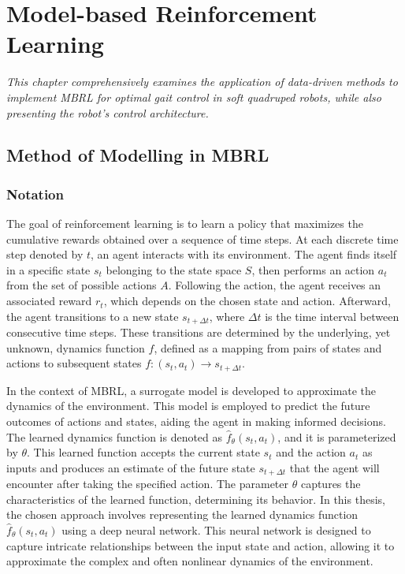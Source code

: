 \chapter{Model-based Reinforcement Learning}
\label{chap4}
\textit{This chapter comprehensively examines the application of data-driven methods to implement \ac{MBRL} for optimal gait control in soft quadruped robots, while also presenting the robot's control architecture.}

\section{Method of Modelling in MBRL}
\subsection{Notation}
The goal of reinforcement learning is to learn a policy that maximizes the cumulative rewards obtained over a sequence of time steps. At each discrete time step denoted by $t$, an agent interacts with its environment. The agent finds itself in a specific state $s_t$ belonging to the state space $S$, then performs an action $a_t$ from the set of possible actions $A$. Following the action, the agent receives an associated reward $r_t$, which depends on the chosen state and action. Afterward, the agent transitions to a new state $s_{t+\Delta t}$, where $\Delta t$ is the time interval between consecutive time steps. These transitions are determined by the underlying, yet unknown, dynamics function $f$, defined as a mapping from pairs of states and actions to subsequent states $f: (s_t, a_t) \rightarrow s_{t+\Delta t}$. 

In the context of \ac{MBRL}, a surrogate model is developed to approximate the dynamics of the environment. This model is employed to predict the future outcomes of actions and states, aiding the agent in making informed decisions. The learned dynamics function is denoted as $\hat{f}_\theta(s_t, a_t)$, and it is parameterized by $\theta$. This learned function accepts the current state $s_t$ and the action $a_t$ as inputs and produces an estimate of the future state $s_{t+\Delta t}$ that the agent will encounter after taking the specified action. The parameter $\theta$ captures the characteristics of the learned function, determining its behavior. In this thesis, the chosen approach involves representing the learned dynamics function $\hat{f}_\theta(s_t, a_t)$ using a deep neural network. This neural network is designed to capture intricate relationships between the input state and action, allowing it to approximate the complex and often nonlinear dynamics of the environment. 

